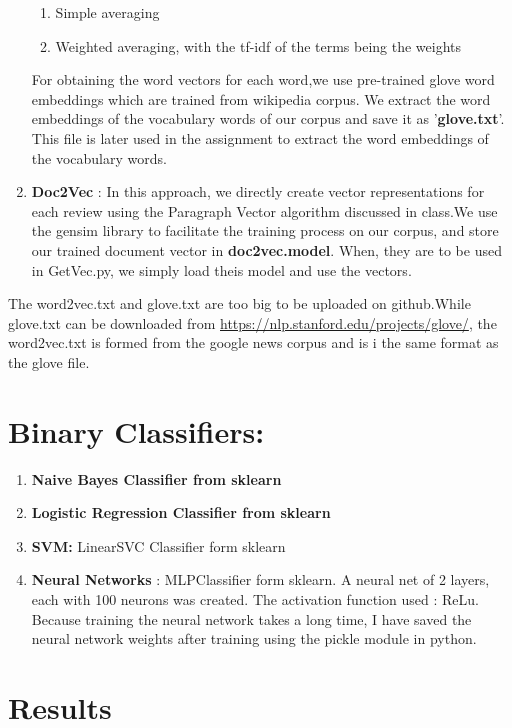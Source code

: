\documentclass{article}
\begin{document}
\begin{enumerate}
    \begin{enumerate}
        \item Simple averaging
        \item Weighted averaging, with the tf-idf of the terms being the weights
    \end{enumerate}
    For obtaining the word vectors for each word,we use pre-trained glove word embeddings which are trained from wikipedia corpus. We extract the word embeddings of the vocabulary words of our corpus and save it as '\textbf{glove.txt}'. This file is later used in the assignment to extract the word embeddings of the vocabulary words.
    \item \textbf{Doc2Vec} : In this approach, we directly create vector representations for each review using the Paragraph Vector algorithm discussed in class.We use the gensim library to facilitate the training process on our corpus, and store our trained document vector in \textbf{doc2vec.model}. When, they are to be used in GetVec.py, we simply load theis model and use the vectors.
\end{enumerate}

The word2vec.txt and glove.txt are too big to be uploaded on github.While glove.txt can be downloaded from \url{https://nlp.stanford.edu/projects/glove/}, the word2vec.txt is formed from the google news corpus and is i the same format as the glove file.
\section{Binary Classifiers:}


\begin{enumerate}
    \item \textbf{Naive Bayes Classifier from sklearn}
    \item \textbf{Logistic Regression Classifier from sklearn}
    \item \textbf{SVM: } LinearSVC Classifier form sklearn
    \item \textbf{Neural Networks} : MLPClassifier form sklearn. A neural net of 2 layers, each with 100 neurons was created. The activation function used : ReLu. Because training the neural network takes a long time, I have saved the neural network weights after training using the pickle module in python.

\end{enumerate}

\section{Results}
\end{document}
